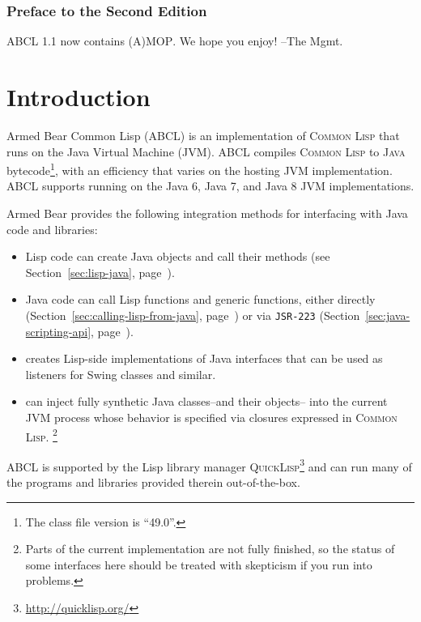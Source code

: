 \documentclass[10pt]{book}
\begin{document}

\subsection{Preface to the Second Edition}

\textsc{ABCL} 1.1 now contains \textsc{(A)MOP}.  We hope you enjoy!  --The Mgmt.

\chapter{Introduction}

Armed Bear Common Lisp (\textsc{ABCL}) is an implementation of
\textsc{Common Lisp} that runs on the Java Virtual Machine
(\textsc{JVM}).  \textsc{ABCL} compiles \textsc{Common Lisp} to
\textsc{Java} bytecode\footnote{The class file version is ``49.0''.},
with an efficiency that varies on the hosting JVM implementation.
\textsc{ABCL} supports running on the Java 6, Java 7, and Java 8
\textsc{JVM} implementations.

Armed Bear provides the following integration methods for interfacing
with Java code and libraries:
\begin{itemize}
\item Lisp code can create Java objects and call their methods (see
  Section~\ref{sec:lisp-java}, page~\pageref{sec:lisp-java}).
\item Java code can call Lisp functions and generic functions, either
  directly (Section~\ref{sec:calling-lisp-from-java},
  page~\pageref{sec:calling-lisp-from-java}) or via \texttt{JSR-223}
  (Section~\ref{sec:java-scripting-api},
  page~\pageref{sec:java-scripting-api}).
\item {} creates Lisp-side implementations
  of Java interfaces that can be used as listeners for Swing classes and
  similar.
\item {} can inject fully synthetic Java
  classes--and their objects-- into the current JVM process whose
  behavior is specified via closures expressed in \textsc{Common
    Lisp}. \footnote{Parts of the current implementation are not fully
    finished, so the status of some interfaces here should be treated
    with skepticism if you run into problems.}

\end{itemize}
\textsc{ABCL} is supported by the Lisp library manager
\textsc{QuickLisp}\footnote{\url{http://quicklisp.org/}} and can run many of the
programs and libraries provided therein out-of-the-box.
\end{document}
